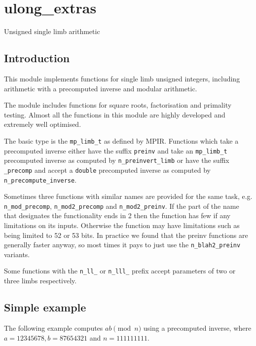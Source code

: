 \documentclass[a4paper,10pt]{book}
\newcommand{\code}{\lstinline}
\begin{document}
{{%

\chapter{ulong\_extras}
\epigraph{Unsigned single limb arithmetic}{}

\section{Introduction}

This module implements functions for single limb unsigned integers,
including arithmetic with a precomputed inverse and modular arithmetic.

The module includes functions for square roots, factorisation and
primality testing. Almost all the functions in this module are highly
developed and extremely well optimised.

The basic type is the \code{mp_limb_t} as defined by MPIR. Functions
which take a precomputed inverse either have the suffix \code{preinv}
and take an \code{mp_limb_t} precomputed inverse as computed by
\code{n_preinvert_limb} or have the suffix \code{_precomp} and accept
a \code{double} precomputed inverse as computed by
\code{n_precompute_inverse}.

Sometimes three functions with similar names are provided for the
same task, e.g. \code{n_mod_precomp}, \code{n_mod2_precomp} and
\code{n_mod2_preinv}. If the part of the name that designates the
functionality ends in 2 then the function has few if any limitations
on its inputs. Otherwise the function may have limitations such as
being limited to 52 or 53 bits. In practice we found that the
preinv functions are generally faster anyway, so most times it pays
to just use the \code{n_blah2_preinv} variants.

Some functions with the \code{n_ll_} or \code{n_lll_} prefix accept
parameters of two or three limbs respectively.

\section{Simple example}

The following example computes $ab \pmod{n}$ using a precomputed
inverse, where $a = 12345678, b = 87654321$ and $n = 111111111$.

}}
\end{document}

